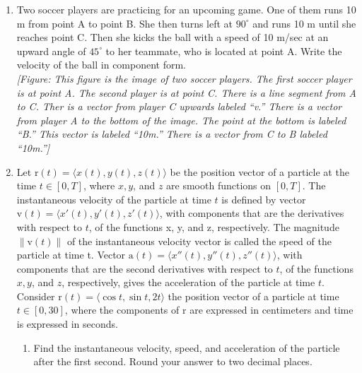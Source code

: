 \documentclass{exercises}
\begin{document}
\begin{enumerate}[resume]
\begin{enumerate}[label=(\alph*)]
  \item Find the gravitational force $\text{F}$ acting on the block of cement that counterbalances the sum $\text{F}_{1}+\text{F}_{2}+\text{F}_{3}$ of the forces of tension in the cables.
  \item Find forces $\text{F}_{1}$, $\text{F}_{2}$, and $\text{F}_{3}$. Express the answer in component form.
\end{enumerate}
\item Two soccer players are practicing for an upcoming game. One of them runs 10 m from point A to point B. She then turns left at $90^\circ$ and runs 10 m until she reaches point C. Then she kicks the ball with a speed of 10 m/sec at an upward angle of $45^\circ$ to her teammate, who is located at point A. Write the velocity of the ball in component form. \\ \textit{[Figure: This figure is the image of two soccer players. The first soccer player is at point A. The second player is at point C. There is a line segment from A to C. Ther is a vector from player C upwards labeled ``v.'' There is a vector from player A to the bottom of the image. The point at the bottom is labeled ``B.'' This vector is labeled ``10m.'' There is a vector from C to B labeled ``10m.'']}
\item Let $\text{r}(t)=\langle x(t),y(t),z(t)\rangle$ be the position vector of a particle at the time $t\in[0,T]$, where $x,y$, and $z$ are smooth functions on $[0,T]$. The instantaneous velocity of the particle at time $t$ is defined by vector $\text{v}(t)=\langle x'(t),y'(t),z'(t)\rangle$, with components that are the derivatives with respect to $t$, of the functions x, y, and z, respectively. The magnitude $\|\text{v}(t)\|$ of the instantaneous velocity vector is called the speed of the particle at time t. Vector $\text{a}(t)=\langle x''(t),y''(t),z''(t)\rangle$, with components that are the second derivatives with respect to $t$, of the functions $x,y$, and $z$, respectively, gives the acceleration of the particle at time $t$. Consider $\text{r}(t)=\langle \cos t,\sin t,2t\rangle$ the position vector of a particle at time $t\in[0,30]$, where the components of $\text{r}$ are expressed in centimeters and time is expressed in seconds.
\begin{enumerate}[label=(\alph*)]
  \item Find the instantaneous velocity, speed, and acceleration of the particle after the first second. Round your answer to two decimal places.

\end{enumerate}
\end{enumerate}
\end{document}

